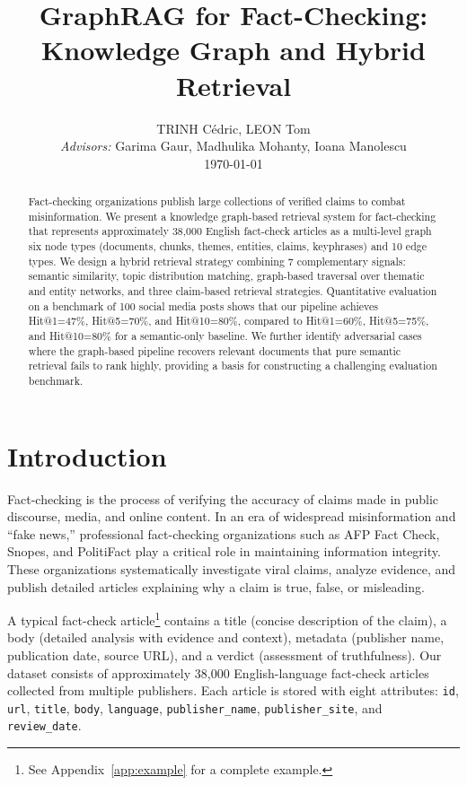 \documentclass[10pt]{article}
\title{\vspace{-1.5cm}\textbf{\Large GraphRAG for Fact-Checking: \\ Knowledge Graph and Hybrid Retrieval}}
\author{
    \normalsize TRINH Cédric, LEON Tom \\[4pt]
    \normalsize \textit{Advisors:} Garima Gaur, Madhulika Mohanty, Ioana Manolescu \\
    \normalsize \today
}
\date{}
\begin{document}
\maketitle

\begin{abstract}
Fact-checking organizations publish large collections of verified claims to combat misinformation. We present a knowledge graph-based retrieval system for fact-checking that represents approximately 38,000 English fact-check articles as a multi-level graph six node types (documents, chunks, themes, entities, claims, keyphrases) and 10 edge types. We design a hybrid retrieval strategy combining 7 complementary signals: semantic similarity, topic distribution matching, graph-based traversal over thematic and entity networks, and three claim-based retrieval strategies. Quantitative evaluation on a benchmark of 100 social media posts shows that our pipeline achieves Hit@1=47\%, Hit@5=70\%, and Hit@10=80\%, compared to Hit@1=60\%, Hit@5=75\%, and Hit@10=80\% for a semantic-only baseline. We further identify adversarial cases where the graph-based pipeline recovers relevant documents that pure semantic retrieval fails to rank highly, providing a basis for constructing a challenging evaluation benchmark.
\end{abstract}

\section{Introduction}

Fact-checking is the process of verifying the accuracy of claims made in public discourse, media, and online content. In an era of widespread misinformation and ``fake news,'' professional fact-checking organizations such as AFP Fact Check, Snopes, and PolitiFact play a critical role in maintaining information integrity. These organizations systematically investigate viral claims, analyze evidence, and publish detailed articles explaining why a claim is true, false, or misleading.

A typical fact-check article\footnote{See Appendix~\ref{app:example} for a complete example.} contains a title (concise description of the claim), a body (detailed analysis with evidence and context), metadata (publisher name, publication date, source URL), and a verdict (assessment of truthfulness). Our dataset consists of approximately 38,000 English-language fact-check articles collected from multiple publishers. Each article is stored with eight attributes: \texttt{id}, \texttt{url}, \texttt{title}, \texttt{body}, \texttt{language}, \texttt{publisher\_name}, \texttt{publisher\_site}, and \texttt{review\_date}.
\end{document}
